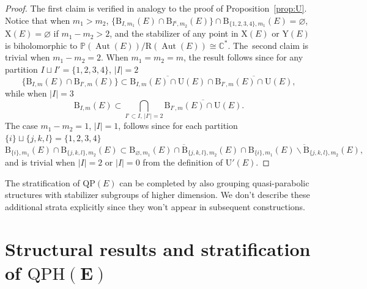 \documentclass[pdftex]{sigma}
\newcommand{\field}[1]{\ensuremath{\mathbb{#1}}}
\newcommand{\CC}{\field{C}}
\newcommand{\PP}{\field{P}}
\DeclareMathOperator{\Aut}{Aut}
\numberwithin{equation}{section}
\begin{document}
\begin{proof}
The first claim is verified in analogy to the proof of Proposition~\ref{prop:U}. Notice that when $m_{1}>m_{2}$, $\{\mathrm{B}_{I,m_{1}}(E)\cap\mathrm{B}_{I^{\mathsf{c}},m_{2}}(E)\} \cap\mathrm{B}_{\{1,2,3,4\},m_{1}}(E)=\varnothing $, $\mathrm{X}(E)=\varnothing $ if $m_{1}-m_{2}> 2$, and the stabilizer of any point in $\mathrm{X}(E)$ or $\mathrm{Y}(E)$ is biholomorphic to $\PP(\Aut(E))/\mathrm{R}(\Aut(E))\cong\CC^{*}$. The~second claim is trivial when $m_{1}-m_{2}=2$. When $m_{1}=m_{2}=m$, the result follows since for any partition $I\sqcup I' =\{1,2,3,4\}$, $\vert I\vert =2$
\[
\bigl\{\mathrm{B}_{I,m}(E)\cap\mathrm{B}_{I',m}(E)\bigr\} \subset \overline{\mathrm{B}_{I,m}(E)\cap\mathrm{U}(E)}\cap\overline{\mathrm{B}_{I',m}(E)\cap\mathrm{U}(E)},
\]
while when $\vert I\vert = 3$
\[
\mathrm{B}_{I,m}(E) \subset \bigcap_{I'\subset I,\, \vert I'\vert = 2}\overline{\mathrm{B}_{I',m}(E)\cap\mathrm{U}(E)}.
\]
The case $m_{1}-m_{2} =1$, $\vert I\vert =1$, follows since for each partition $\{i\}\sqcup\{j,k,l\} = \{1,2,3,4\}$
\[
\mathrm{B}_{\{i\},m_{1}}(E)\cap\mathrm{B}_{\{j,k,l\},m_{2}}(E) \subset \overline{\mathrm{B}_{\varnothing ,m_{1}}(E)\cap\mathrm{B}_{\{j,k,l\},m_{2}}(E)} \cap \overline{\mathrm{B}_{\{i\},m_{1}}(E)\backslash\mathrm{B}_{\{j,k,l\},m_{2}}(E)},
\]
and is trivial when $\vert I\vert =2$ or $\vert I \vert =0$ from the definition of $\mathrm{U}'(E)$.
\end{proof}

The stratification of $\mathrm{QP}(E)$ can be completed by also grouping quasi-parabolic structures with stabilizer subgroups of higher dimension. We don't describe these additional strata explicitly since they won't appear in subsequent constructions.


\section[Structural results and stratification of QPH(E)]
{Structural results and stratification of $\boldsymbol{\mathrm{QPH}(E)}$}\label{sec:struct}
\end{document}

